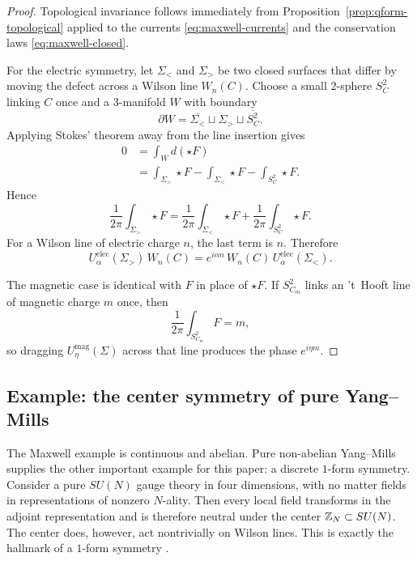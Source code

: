 \begin{proof}
Topological invariance follows immediately from Proposition~\ref{prop:qform-topological} applied to the currents \eqref{eq:maxwell-currents} and the conservation laws \eqref{eq:maxwell-closed}.

\medskip

\noindent For the electric symmetry, let $\Sigma_{<}$ and $\Sigma_{>}$ be two closed surfaces that differ by moving the defect across a Wilson line $W_n(C)$. Choose a small $2$-sphere $S^2_C$ linking $C$ once and a $3$-manifold $W$ with boundary
\begin{equation*}
\partial W=\overline{\Sigma_{<}}\sqcup \Sigma_{>}\sqcup \overline{S^2_C}.
\end{equation*}
Applying Stokes' theorem away from the line insertion gives
\begin{align*}
0
&=
\int_W d(\star F) \\
&=
\int_{\Sigma_{>}}\star F
-\int_{\Sigma_{<}}\star F
-\int_{S^2_C}\star F.
\end{align*}
Hence
\begin{equation*}
\frac{1}{2\pi}\int_{\Sigma_{>}}\star F
=
\frac{1}{2\pi}\int_{\Sigma_{<}}\star F
+
\frac{1}{2\pi}\int_{S^2_C}\star F.
\end{equation*}
For a Wilson line of electric charge $n$, the last term is $n$. Therefore
\begin{equation*}
U^{\mathrm{elec}}_{\alpha}(\Sigma_{>})\,W_n(C)
=
e^{i\alpha n}\,W_n(C)\,U^{\mathrm{elec}}_{\alpha}(\Sigma_{<}).
\end{equation*}

\medskip

\noindent The magnetic case is identical with $F$ in place of $\star F$. If $S^2_{C_m}$ links an 't~Hooft line of magnetic charge $m$ once, then
\begin{equation*}
\frac{1}{2\pi}\int_{S^2_{C_m}} F = m,
\end{equation*}
so dragging $U^{\mathrm{mag}}_{\eta}(\Sigma)$ across that line produces the phase $e^{i\eta m}$.
\end{proof}

\subsection{Example: the center symmetry of pure Yang--Mills}

The Maxwell example is continuous and abelian. Pure non-abelian Yang--Mills supplies the other important example for this paper: a discrete $1$-form symmetry. Consider a pure $SU(N)$ gauge theory in four dimensions, with no matter fields in representations of nonzero $N$-ality. Then every local field transforms in the adjoint representation and is therefore neutral under the center $\mathbb{Z}_N\subset SU(N)$. The center does, however, act nontrivially on Wilson lines. This is exactly the hallmark of a $1$-form symmetry \cite{GKSW2015,Bhardwaj2023Lectures}.

